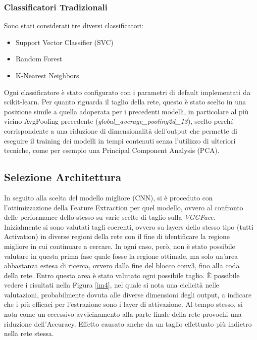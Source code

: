 \subsubsection{Classificatori Tradizionali}
Sono stati considerati tre diversi classificatori:
\begin{itemize}
    \item Support Vector Classifier (SVC)
    \item Random Forest
    \item K-Nearest Neighbors
\end{itemize}
Ogni classificatore è stato configurato con i parametri di default implementati da scikit-learn. Per quanto riguarda il taglio della rete, questo è stato scelto in una posizione simile a quella adoperata per i precedenti modelli, in particolare al più vicino AvgPooling precedente (\textit{global\_average\_pooling2d\_13}), scelto perché corrispondente a una riduzione di dimensionalità dell'output che permette di eseguire il training dei modelli in tempi contenuti senza l'utilizzo di ulteriori tecniche, come per esempio una Principal Component Analysis (PCA). 

\subsection{Selezione Architettura}

In seguito alla scelta del modello migliore (CNN), si è proceduto con l'ottimizzazione della Feature Extraction per quel modello, ovvero al confronto delle performance dello stesso su varie scelte di taglio sulla \textit{VGGFace}. Inizialmente si sono valutati tagli coerenti, ovvero su layers dello stesso tipo (tutti Activation) in diverse regioni della rete con il fine di identificare la regione migliore in cui continuare a cercare. In ogni caso, però, non è stato possibile valutare in questa prima fase quale fosse la regione ottimale, ma solo un'area abbastanza estesa di ricerca, ovvero dalla fine del blocco conv3, fino alla coda della rete. Entro questa area è stato valutato ogni possibile taglio. È possibile vedere i risultati nella Figura \ref{im4}, nel quale si nota una ciclicità nelle valutazioni, probabilmente dovuta alle diverse dimensioni degli output, a indicare che i più efficaci per l'estrazione sono i layer di attivazione. Al tempo stesso, si nota come un eccessivo avvicinamento alla parte finale della rete provochi una riduzione dell'Accuracy. Effetto causato anche da un taglio effettuato più indietro nella rete stessa.

